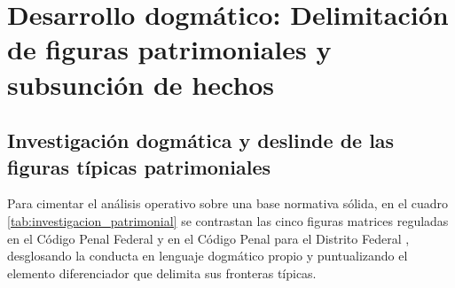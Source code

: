 \documentclass[spanish,letterpaper,oneside]{article}
\begin{document}
\clearpage
\section[Delimitaci\'on de figuras y subsunci\'on]{Desarrollo dogm\'atico: Delimitaci\'on de figuras patrimoniales y subsunci\'on de hechos}

\subsection{Investigaci\'on dogm\'atica y deslinde de las figuras t\'ipicas patrimoniales}

Para cimentar el an\'alisis operativo sobre una base normativa s\'olida, en el cuadro \ref{tab:investigacion_patrimonial} se contrastan las cinco figuras matrices reguladas en el C\'odigo Penal Federal \citep{cpfOficial2026} y en el C\'odigo Penal para el Distrito Federal \citep{cpdfOficial2026}, desglosando la conducta en lenguaje dogm\'atico propio y puntualizando el elemento diferenciador que delimita sus fronteras t\'ipicas.
\end{document}
